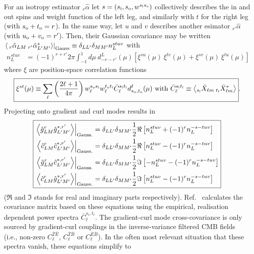 \documentclass{article}
\newcommand{\si}[0]{{s_{\rm i}}}
\newcommand{\ti}[0]{{t_{\rm i}}}
\newcommand{\so}[0]{{s_{\rm o}}}
\renewcommand{\to}[0]{{t_{\rm o}}}
\newcommand{\uo}[0]{{u_{\rm o}}}
\newcommand{\vo}[0]{{v_{\rm o}}}
\newcommand{\av}[1]{\left\langle #1 \right\rangle}
\begin{document}
For an isotropy estimator $_{r}\hat \alpha$ let $s = (\si, \so, w^{\si\so})$ collectively describes the in and out spins and weight function of the left leg, and similarly with $t$ for the right leg (with $\so + \to = r$). In the same way, let $u$ and $v$ describes another esimator $_{r'}\hat \alpha$ (with $\uo + \vo = r'$). Then, their Gaussian covariance may be written $ \left.\av{\:_{r}\hat \alpha_{LM}\: _{r'}\hat \alpha^*_{L'M'}} \right|_{\rm Gauss} \equiv \delta_{LL'}\delta_{MM'}n_L^{stuv}$ with
\begin{equation}
\boxed{
\begin{split} 
n_L^{stuv} & = (-1)^{r + r'}2\pi  \int_{-1}^1 d \mu\:  d^L_{-r -r'}(\mu) \left[\xi^{su}(\mu)\:\xi^{tv}(\mu)  + \xi^{sv}(\mu)\:\xi^{tu}(\mu) \right]
\end{split}}
\end{equation}
where $\xi$ are position-space correlation functions
\begin{equation}\boxed{
\xi^{st}(\mu) \equiv  \sum_\ell \left(\frac{2\ell + 1}{4\pi}\right)w^{\so\si}_\ell w^{\to\ti}_\ell \bar C_\ell^{\si \ti} d^\ell_{\so,\to}(\mu)\textrm{ with } \bar C_\ell^{\si \ti} \equiv \av{ _{\si}\bar X_{\ell m}\: _{\ti} \bar X^*_{\ell m} }}.
\end{equation}
Projecting onto gradient and curl modes results in
\begin{equation} \boxed{
\begin{split}
\left.\av{\hat g^{r}_{LM} \hat g^{*, r'}_{L' M'} }\right|_{\rm Gauss.} &=\delta_{LL'}\delta_{MM'} \frac 12 \Re\left[n_L^{stuv} +  (-1)^{r} n^{-s-tuv}_L\right] \\
		\left.\av{\hat c^{r}_{LM} \hat c^{*, r'}_{L' M'} }\right|_{\rm Gauss.} &= \delta_{LL'}\delta_{MM'}\frac 12 \Re\left[n_L^{stuv} -  (-1)^{r} n^{-s-tuv}_L\right]\\
	\left.\av{\hat g^{r}_{LM} \hat c^{*, r'}_{L' M'} }\right|_{\rm Gauss.} &= \delta_{LL'}\delta_{MM'}\frac 12 \Im\left[-n_L^{stuv} -  (-1)^{r} n^{-s-tuv}_L\right] \\ \left.\av{\hat c^{r}_{LM} \hat g^{*, r'}_{L' M'} }\right|_{\rm Gauss.} &= \delta_{LL'}\delta_{MM'}\frac 12 \Im\left[n_L^{stuv} -  (-1)^{r} n^{-s-tuv}_L\right]
\end{split}}
\end{equation}
($\Re$ and $\Im$ stands for real and imaginary parts respectively). 
Ref.~\cite{Aghanim:2018oex} calculates the covariance matrix based on these equations using the empirical, realisation dependent power spectra $\bar C_\ell^{s_i,t_i}$. The gradient-curl mode cross-covariance is only sourced by gradient-curl couplings in the inverse-variance filtered CMB fields (i.e., non-zero $C_\ell^{\bar T \bar E}$, $C_\ell^{\bar T \bar B}$ or $C_\ell^{\bar E \bar B}$). In the often most relevant situation that these spectra vanish, these equations simplify to
\end{document}
